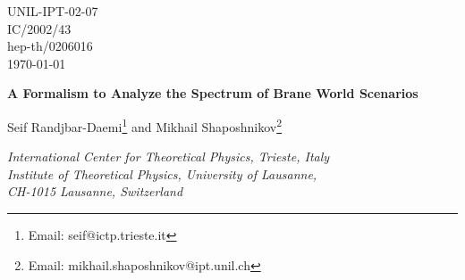 \documentclass[a4paper,12pt]{article}
\begin{document}
\topmargin -1.0cm
\oddsidemargin -0.8cm
\evensidemargin -0.8cm
\pagestyle{empty}
\begin{flushright}
UNIL-IPT-02-07\\
IC/2002/43\\
hep-th/0206016\\
\today
\end{flushright}
\vspace*{5mm}



\begin{center}


{\Large\bf  A  Formalism to Analyze the Spectrum
of Brane World Scenarios}
\vspace{1.0cm}


{\large Seif Randjbar-Daemi\coordHE{}\footnote{Email: seif@ictp.trieste.it}  and
Mikhail Shaposhnikov\coordHE{}\footnote{Email:
mikhail.shaposhnikov@ipt.unil.ch}}\\

\vspace{.6cm}

{\it {\coordHE{}International Center for Theoretical Physics,
Trieste, Italy}}\\
{\it {\coordHE{}Institute of Theoretical Physics, University of
Lausanne,\\
CH-1015 Lausanne, Switzerland}}\\


\vspace{.4cm}
\end{center}


\vspace{1cm}
\begin{abstract}
In this paper we develop a formalism to analyze the spectrum of
small perturbations about arbitrary solutions of Einstein,
Yang-Mills and scalar systems. We consider a  general system of
gravitational, gauge and scalar fields in a \coordHE{}dimensional
space-time and give the bilinear action for the fluctuations of
the fields in the system around an arbitrary solution of the
classical field equations. We then consider warped geometries,
popular in brane world scenarios, and use the light cone gauge to
separate the bilinear action into a totally decoupled spin-two,
-one and -zero fluctuations.  We apply our general scheme to
several examples and discuss in particular localization of abelian
and non-abelian gauge fields of the standard model to branes
generated by scalar fields. We show in particular that the
Nielsen-Olsen string solution gives rise to a normalizable
localized spin-1 field in any number of dimensions.
\end{abstract} 
\vfill
\end{document}
